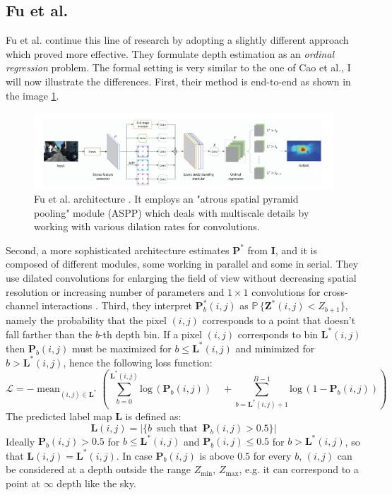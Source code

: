 \subsection{Fu et al.}
Fu et al. \cite{ordinal_regression} continue this line of research by adopting a slightly different approach which proved more effective.
They formulate depth estimation as an \textit{ordinal regression} problem.
The formal setting is very similar to the one of Cao et al., I will now illustrate the differences.
First, their method is end-to-end as shown in the image \ref{fig:Fu_ordinal}.

\begin{figure}
	\centering
	\includegraphics[scale=0.35]{figs/Fu_ordinal}
	\caption{Fu et al. architecture \cite{ordinal_regression}. It employs an "atrous spatial pyramid pooling" module (ASPP) which deals with multiscale details by working with various dilation rates for convolutions. \label{fig:Fu_ordinal}}
\end{figure}

Second, a more sophisticated architecture estimates $\mathbf{P}^{*}$ from $\mathbf{I}$, and it is composed of different modules, some working in parallel and some in serial.
They use dilated convolutions for enlarging the field of view without decreasing spatial resolution or increasing number of parameters \cite{ordinal_regression} and $1 \times 1$ convolutions for cross-channel interactions \cite{ordinal_regression}.
Third, they interpret $\mathbf{P}^{*}_{b}(i, j)$ as $\mathbb{P} \, \{ \mathbf{Z}^{*}(i, j) < Z_{b+1} \}$, namely the probability that the pixel $(i, j)$ corresponds to a point that doesn't fall farther than the $b$-th depth bin.
If a pixel $(i, j)$ corresponds to bin $\mathbf{L}^{*}(i, j)$ then $\mathbf{P}_{b}(i, j)$ must be maximized for $b \leq \mathbf{L}^{*}(i, j)$ and minimized for $b > \mathbf{L}^{*}(i, j)$, hence the following loss function:
\[
	\mathcal{L} = - \mathop{\text{mean}}_{(i, j) \in \mathbf{L}^{*}}
	\left(
		\sum_{b=0}^{\mathbf{L}^{*}(i, j)} \text{log} \,( \mathbf{P}_{b}(i, j)) \quad +
		\sum_{b=\mathbf{L}^{*}(i, j) + 1}^{B-1} \text{log} \, (1 - \mathbf{P}_{b}(i, j))
	\right)
\]
The predicted label map $\mathbf{L}$ is defined as:
\[
	\mathbf{L}(i, j) = | \{b \, \text{ such that } \, \mathbf{P}_{b}(i, j) > 0.5\} |
\]
Ideally $\mathbf{P}_{b}(i, j) > 0.5$ for $b \leq \mathbf{L}^{*}(i, j)$ and $\mathbf{P}_{b}(i, j) \leq 0.5$ for $b > \mathbf{L}^{*}(i, j)$, so that $\mathbf{L}(i, j) = \mathbf{L}^{*}(i, j)$.
In case $\mathbf{P}_{b}(i, j)$ is above $0.5$ for every $b$, $(i, j)$ can be considered at a depth outside the range $Z_{\text{min}}$, $Z_{\text{max}}$, e.g. it can correspond to a point at $\infty$ depth like the sky.

